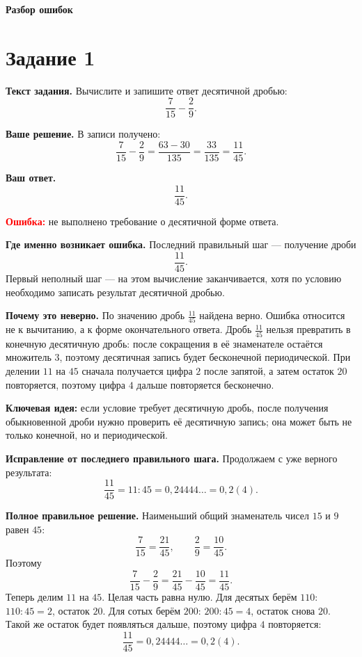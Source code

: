 \documentclass[12pt,a4paper]{article}
\begin{document}
\newpage
\vspace*{\fill}
\begin{center}
{\LARGE\bfseries Разбор ошибок}
\end{center}
\vspace*{\fill}

\newpage
{}\label{task:1}
\section*{Задание 1}

\textbf{Текст задания.}
Вычислите и запишите ответ десятичной дробью:
\[
\frac{7}{15}-\frac{2}{9}.
\]

\textbf{Ваше решение.}
В записи получено:
\[
\frac{7}{15}-\frac{2}{9}
=\frac{63-30}{135}
=\frac{33}{135}
=\frac{11}{45}.
\]

\textbf{Ваш ответ.}
\[
\frac{11}{45}.
\]

\textcolor{red}{\textbf{Ошибка:}} не выполнено требование о десятичной форме ответа.

\textbf{Где именно возникает ошибка.}
Последний правильный шаг --- получение дроби
\[
\frac{11}{45}.
\]
Первый неполный шаг --- на этом вычисление заканчивается, хотя по условию необходимо записать результат десятичной дробью.

\textbf{Почему это неверно.}
По значению дробь $\frac{11}{45}$ найдена верно. Ошибка относится не к вычитанию, а к форме окончательного ответа. Дробь $\frac{11}{45}$ нельзя превратить в конечную десятичную дробь: после сокращения в её знаменателе остаётся множитель $3$, поэтому десятичная запись будет бесконечной периодической. При делении $11$ на $45$ сначала получается цифра $2$ после запятой, а затем остаток $20$ повторяется, поэтому цифра $4$ дальше повторяется бесконечно.

\textcolor{blue!60!black}{\textbf{Ключевая идея:}} если условие требует десятичную дробь, после получения обыкновенной дроби нужно проверить её десятичную запись; она может быть не только конечной, но и периодической.

\textbf{Исправление от последнего правильного шага.}
Продолжаем с уже верного результата:
\[
\frac{11}{45}=11:45=0{,}24444\ldots=0{,}2(4).
\]

\textbf{Полное правильное решение.}
Наименьший общий знаменатель чисел $15$ и $9$ равен $45$:
\[
\frac{7}{15}=\frac{21}{45},
\qquad
\frac{2}{9}=\frac{10}{45}.
\]
Поэтому
\[
\frac{7}{15}-\frac{2}{9}
=\frac{21}{45}-\frac{10}{45}
=\frac{11}{45}.
\]
Теперь делим $11$ на $45$. Целая часть равна нулю. Для десятых берём $110$: $110:45=2$, остаток $20$. Для сотых берём $200$: $200:45=4$, остаток снова $20$. Такой же остаток будет появляться дальше, поэтому цифра $4$ повторяется:
\[
\frac{11}{45}=0{,}24444\ldots=0{,}2(4).
\]
\end{document}
